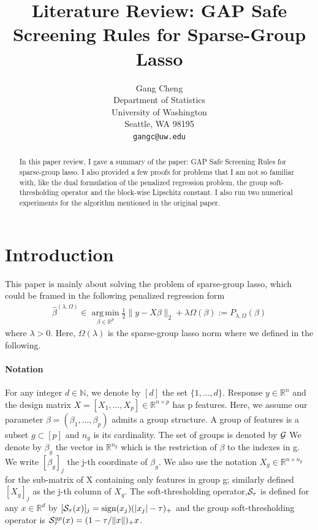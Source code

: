 \documentclass{article}
\title{Literature Review: GAP Safe Screening Rules for Sparse-Group Lasso}
\author{
  Gang Cheng
    \\
  Department of Statistics\\
  University of Washington\\
  Seattle, WA 98195 \\
  \texttt{gangc@uw.edu} \\
}
\DeclareMathOperator*{\argmin}{arg\,min}
\def\real{\mathbb{R}}
\def\cS{{\cal S}}
\begin{document}

\maketitle

\begin{abstract}
In this paper review, I gave a summary of the paper: GAP Safe Screening Rules for sparse-group lasso. I also provided a few proofs for problems that I am not so familiar with, like the dual formulation of the penalized regression problem, the group soft-thresholding operator and the block-wise Lipschitz constant.  I also run two numerical experiments for the algorithm mentioned in the original paper. 
\end{abstract}

\section{Introduction}

This paper is mainly about solving the problem of sparse-group lasso, which could be framed in the following penalized regression form
\begin{align}
\hat{\beta}^{(\lambda,\Omega)} \in \argmin\limits_{\beta \in \real^p} \frac{1}{2}\|y - X\beta\|_2 + \lambda \Omega(\beta) := P_{\lambda,\Omega}(\beta)
\end{align}
where $\lambda > 0$. Here, $\Omega(\lambda)$ is the sparse-group lasso norm where we defined in the following. 

\paragraph{Notation} For any integer $d \in \mathbb{N}$, we denote by $[d]$ the set $\{1,\ldots,d\}$. Response $y \in \real^n$ and the design matrix $X = [X_1,\ldots,X_p] \in \real^{n \times p}$ has p features. Here, we assume our parameter $\beta = (\beta_1,\ldots,\beta_p)$ admits a group structure. A group of features is a subset $g \subset [p]$ and $n_g$ is its cardinality. The set of groups is denoted by $\cal{G}$  We denote by $\beta_g$ the vector in $\real^{n_g}$ which is the restriction of $\beta$ to the indexes in g. We write $[\beta_g]_j$ the j-th coordinate of $\beta_g$. We also use the notation $X_g \in \real^{n \times n_g}$ for the sub-matrix of X containing only features in group g;  similarly defined $[X_g]_j$ as the j-th column of $X_g$. The soft-thresholding operator,$\cS_{\tau}$  is defined for any $x \in \real^d$ by $[\cS_{\tau}( x )]_j = \text{sign}(x_j)(|x_j| - \tau)_{+}$ and the group soft-thresholding operator is $\cS^{gp}_{\tau}(x) = (1 - \tau/\|x\|)_{+}x$.
\end{document}
